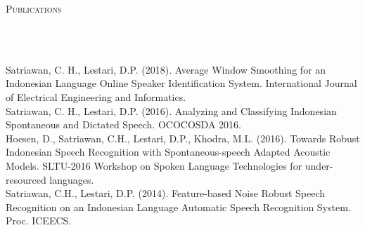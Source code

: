\documentclass{article}
\newcommand{\lineunder} {
    \vspace*{-8pt} \\
    \hspace*{-10pt} \hrulefill \\
}
\newcommand{\header} [1] {
    \begin{center}
      {\large \scshape {#1}}
      \lineunder
    \end{center}
    \vspace*{-8pt}
}
\begin{document}
\header{Publications}
\vspace{1mm}
Satriawan, C. H., Lestari, D.P. (2018). Average Window Smoothing for an
Indonesian Language Online Speaker Identification System.
International Journal of Electrical Engineering and Informatics.\\
\vspace*{2mm}
Satriawan, C. H., Lestari, D.P. (2016). Analyzing and Classifying Indonesian Spontaneous and Dictated Speech. OCOCOSDA 2016.\\
\vspace*{2mm}
Hoesen, D., Satriawan, C.H., Lestari, D.P., Khodra, M.L. (2016). Towards Robust Indonesian Speech Recognition with Spontaneous-speech Adapted Acoustic Models.
SLTU-2016 Workshop on Spoken Language Technologies for under-resourced
languages.\\
\vspace*{2mm}
Satriawan, C.H., Lestari, D.P. (2014). Feature-based Noise Robust Speech Recognition on an Indonesian Language Automatic Speech Recognition System.
Proc. ICEECS.\\

\ 
\end{document}
